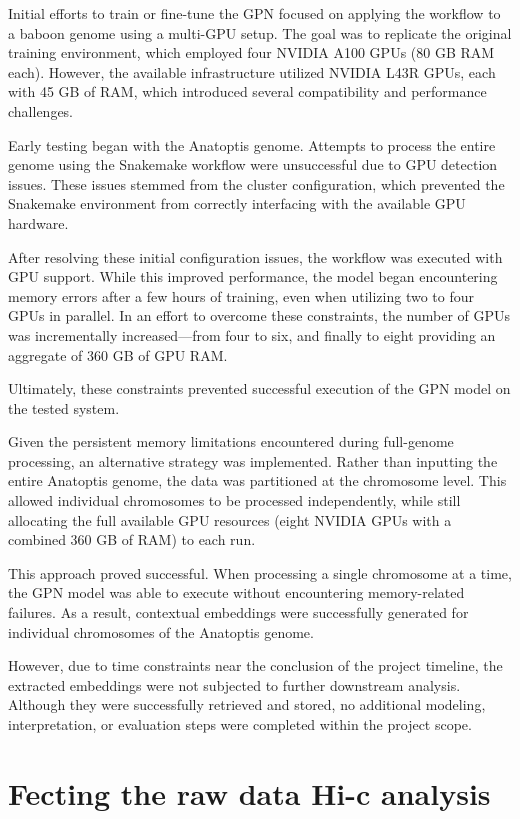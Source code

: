 \documentclass[
  a4paper,
  openany]{scrbook}
\begin{document}
Initial efforts to train or fine-tune the GPN focused on applying the
workflow to a baboon genome using a multi-GPU setup. The goal was to
replicate the original training environment, which employed four NVIDIA
A100 GPUs (80 GB RAM each). However, the available infrastructure
utilized NVIDIA L43R GPUs, each with 45 GB of RAM, which introduced
several compatibility and performance challenges.

Early testing began with the Anatoptis genome. Attempts to process the
entire genome using the Snakemake workflow were unsuccessful due to GPU
detection issues. These issues stemmed from the cluster configuration,
which prevented the Snakemake environment from correctly interfacing
with the available GPU hardware.

After resolving these initial configuration issues, the workflow was
executed with GPU support. While this improved performance, the model
began encountering memory errors after a few hours of training, even
when utilizing two to four GPUs in parallel. In an effort to overcome
these constraints, the number of GPUs was incrementally increased---from
four to six, and finally to eight providing an aggregate of 360 GB of
GPU RAM.

Ultimately, these constraints prevented successful execution of the GPN
model on the tested system.

Given the persistent memory limitations encountered during full-genome
processing, an alternative strategy was implemented. Rather than
inputting the entire Anatoptis genome, the data was partitioned at the
chromosome level. This allowed individual chromosomes to be processed
independently, while still allocating the full available GPU resources
(eight NVIDIA GPUs with a combined 360 GB of RAM) to each run.

This approach proved successful. When processing a single chromosome at
a time, the GPN model was able to execute without encountering
memory-related failures. As a result, contextual embeddings were
successfully generated for individual chromosomes of the Anatoptis
genome.

However, due to time constraints near the conclusion of the project
timeline, the extracted embeddings were not subjected to further
downstream analysis. Although they were successfully retrieved and
stored, no additional modeling, interpretation, or evaluation steps were
completed within the project scope.

\section{Fecting the raw data Hi-c
analysis}\label{fecting-the-raw-data-hi-c-analysis}
\end{document}
